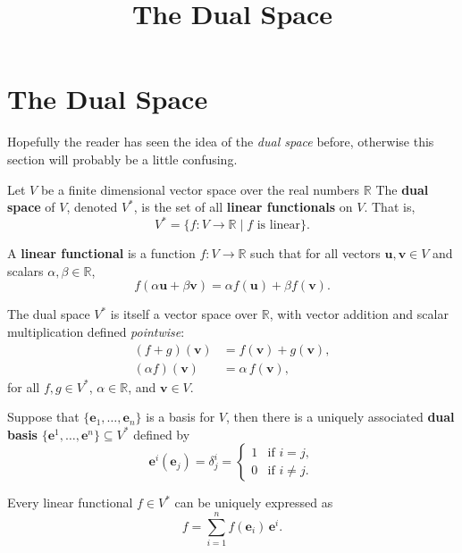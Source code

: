 \documentclass[11pt]{article}
\title{The Dual Space}
\author{}
\date{}
\begin{document}
\maketitle

\Large




\section*{\huge The Dual Space}

Hopefully the reader has seen the idea of the \emph{dual space} before, otherwise this section will probably be a little confusing. 

Let $ V $ be a finite dimensional vector space over the real numbers $ \mathbb{R} $  
The \textbf{dual space} of $ V $, denoted $ V^* $, is the set of all \textbf{linear functionals} on $ V $. That is,
\[
V^* = \{ f: V \to \mathbb{R} \mid f \text{ is linear} \}.
\]

A \textbf{linear functional} is a function $ f: V \to \mathbb{R} $ such that for all vectors $ \mathbf{u}, \mathbf{v} \in V $ and scalars $ \alpha, \beta \in \mathbb{R} $,
\[
f(\alpha \mathbf{u} + \beta \mathbf{v}) = \alpha f(\mathbf{u}) + \beta f(\mathbf{v}).
\]

The dual space $ V^* $ is itself a vector space over $ \mathbb{R} $, with vector addition and scalar multiplication defined \textit{pointwise}:
\begin{align*}
(f + g)(\mathbf{v}) &= f(\mathbf{v}) + g(\mathbf{v}), \\
(\alpha f)(\mathbf{v}) &= \alpha \, f(\mathbf{v}),
\end{align*}
for all $ f, g \in V^* $, $ \alpha \in \mathbb{R} $, and $ \mathbf{v} \in V $.

Suppose that $ \{ \mathbf{e}_1, \dots, \mathbf{e}_n \} $ is a basis for $ V $, then there is a uniquely associated \textbf{dual basis} $ \{ \mathbf{e}^1, \dots, \mathbf{e}^n \} \subseteq V^* $ defined by
    \[
    \mathbf{e}^i(\mathbf{e}_j) = \delta^i_j =
    \begin{cases}
    1 & \text{if } i = j, \\
    0 & \text{if } i \ne j.
    \end{cases}
    \]
    
    Every linear functional $ f \in V^* $ can be uniquely expressed as
    \[
    f = \sum_{i=1}^n f(\mathbf{e}_i) \, \mathbf{e}^i.
    \]
\end{document}
